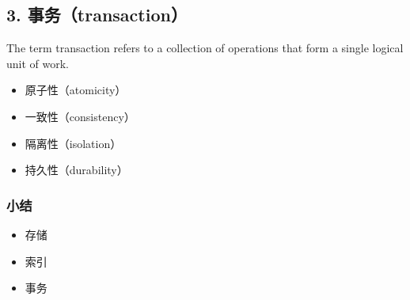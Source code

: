 \documentclass[aspectratio=169, 14pt]{beamer}
\begin{document}
\begin{frame}
	\section{\textcolor{darkmidnightblue}{3. 事务（transaction）}}
	The term \alert{transaction} refers to a collection of operations that form a single logical unit of work.
	\begin{itemize}
		\item 原子性（atomicity）
		\item 一致性（consistency）
		\item 隔离性（isolation）
		\item 持久性（durability）
	\end{itemize}

\end{frame}

\begin{frame}
	\frametitle{小结}

	\begin{itemize}
		\item 存储
		\item 索引
		\item 事务
	\end{itemize}

\end{frame}
\end{document}
